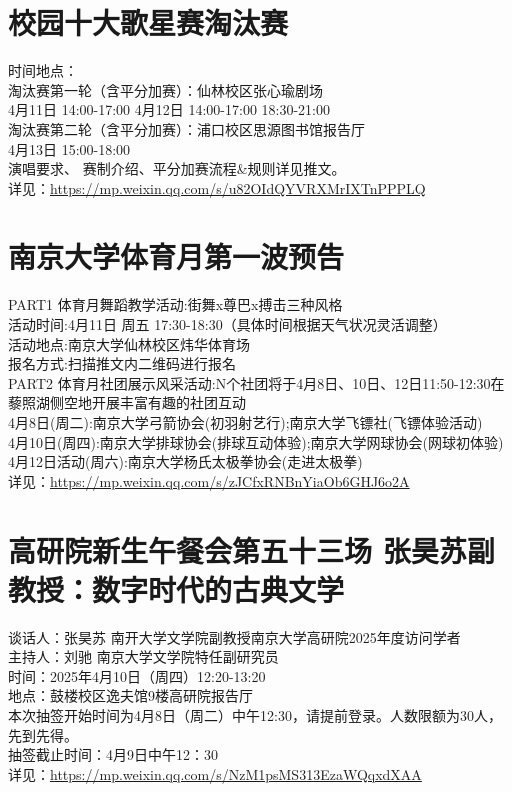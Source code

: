 \documentclass[letterpaper, 12pt]{article}
\begin{document}
\begin{multicols}{2}
\section{校园十大歌星赛淘汰赛}
时间地点：
\\淘汰赛第一轮（含平分加赛）：仙林校区张心瑜剧场
\\4月11日 14:00-17:00  4月12日 14:00-17:00 18:30-21:00
\\淘汰赛第二轮（含平分加赛）：浦口校区思源图书馆报告厅
\\4月13日 15:00-18:00 
\\演唱要求、 赛制介绍、平分加赛流程\&规则详见推文。
\\详见：\url{https://mp.weixin.qq.com/s/u82OIdQYVRXMrIXTnPPPLQ}



\section{南京大学体育月第一波预告}
PART1 体育月舞蹈教学活动:街舞x尊巴x搏击三种风格
\\活动时间:4月11日 周五 17:30-18:30（具体时间根据天气状况灵活调整）
\\活动地点:南京大学仙林校区炜华体育场
\\报名方式:扫描推文内二维码进行报名
\\PART2 体育月社团展示风采活动:N个社团将于4月8日、10日、12日11:50-12:30在藜照湖侧空地开展丰富有趣的社团互动
\\4月8日(周二):南京大学弓箭协会(初羽射艺行);南京大学飞镖社(飞镖体验活动)
\\4月10日(周四):南京大学排球协会(排球互动体验);南京大学网球协会(网球初体验)
\\4月12日活动(周六):南京大学杨氏太极拳协会(走进太极拳)
\\详见：\url{https://mp.weixin.qq.com/s/zJCfxRNBnYiaOb6GHJ6o2A}

\section{高研院新生午餐会第五十三场 张昊苏副教授：数字时代的古典文学}
谈话人：张昊苏 南开大学文学院副教授南京大学高研院2025年度访问学者
\\主持人：刘驰 南京大学文学院特任副研究员
\\时间：2025年4月10日（周四）12:20-13:20
\\地点：鼓楼校区逸夫馆9楼高研院报告厅
\\本次抽签开始时间为4月8日（周二）中午12:30，请提前登录。人数限额为30人，先到先得。
\\抽签截止时间：4月9日中午12：30
\\详见：\url{https://mp.weixin.qq.com/s/NzM1psMS313EzaWQqxdXAA}

\end{multicols}
\end{document}
